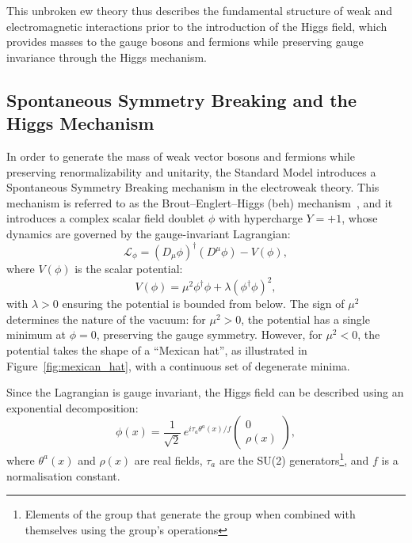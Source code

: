 This unbroken \acrshort{ew} theory thus describes the fundamental structure of weak and electromagnetic interactions prior to the introduction of the Higgs field, which provides masses to the gauge bosons and fermions while preserving gauge invariance through the Higgs mechanism.

\subsection{Spontaneous Symmetry Breaking and the Higgs Mechanism}
\label{subsec:higgs_mech}

In order to generate the mass of weak vector bosons and fermions while preserving renormalizability and unitarity, the Standard Model introduces a Spontaneous Symmetry Breaking mechanism in the electroweak theory. 
This mechanism is referred to as the Brout–Englert–Higgs (\acrshort{beh}) mechanism~\cite{Brout,HiggsSpontan}, and it introduces a complex scalar field doublet $\phi$ with hypercharge $Y=+1$, whose dynamics are governed by the gauge-invariant Lagrangian:
\begin{equation}
\mathcal{L}_\phi = (D_\mu \phi)^\dagger(D^\mu \phi) - V(\phi),
\end{equation}
where $V(\phi)$ is the scalar potential:
\begin{equation}
V(\phi) = \mu^2 \phi^\dagger \phi + \lambda(\phi^\dagger \phi)^2,
\label{eq:higgs_potential}
\end{equation}
with $\lambda > 0$ ensuring the potential is bounded from below. The sign of $\mu^2$ determines the nature of the vacuum: for $\mu^2 > 0$, the potential has a single minimum at $\phi = 0$, preserving the gauge symmetry. However, for $\mu^2 < 0$, the potential takes the shape of a “Mexican hat”, as illustrated in Figure~\ref{fig:mexican_hat}, with a continuous set of degenerate minima.

Since the Lagrangian is gauge invariant, the Higgs field can be described using an exponential decomposition:
\begin{equation}
\phi(x) = \frac{1}{\sqrt{2}} \, e^{i \tau_{a} \theta^a(x)/f} \begin{pmatrix}
0 \\
\rho(x)
\end{pmatrix},
\label{eq:higgs_param}
\end{equation}
where $\theta^a(x)$ and $\rho(x)$ are real fields, $\tau_{a}$ are the SU(2) generators\footnote{Elements of the group that generate the group when combined with themselves using the group's operations}, and $f$ is a normalisation constant.

